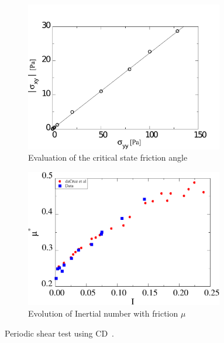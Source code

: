 \begin{figure}[tbhp]
\centering
\begin{subfigure}[t]{0.475\textwidth}
\includegraphics[width=0.95\textwidth]{Sxy_vs_Syy_Slope}
\caption{Evaluation of the critical state friction angle}
\label{fig:Sxy_vs_Syy_Slope}
\end{subfigure}
%
\begin{subfigure}[t]{0.475\textwidth}
\includegraphics[width=0.95\textwidth]{mu_vs_I}
\caption{Evolution of Inertial number with friction $\mu$}
\label{fig:mu_vs_I}
\end{subfigure}
\caption{Periodic shear test using CD~\citep{Mutabaruka2013}.}
\label{fig:Shear_Test_Slope}
\end{figure}

